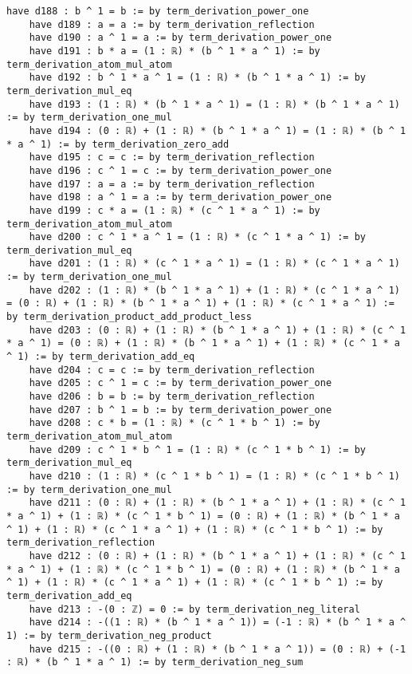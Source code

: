 \documentclass{article}
\begin{document}
\begin{tcolorbox}[colback=white!10, width=\linewidth]
\begin{lstlisting}[language=Lean4]
    have d188 : b ^ 1 = b := by term_derivation_power_one
    have d189 : a = a := by term_derivation_reflection
    have d190 : a ^ 1 = a := by term_derivation_power_one
    have d191 : b * a = (1 : ℝ) * (b ^ 1 * a ^ 1) := by term_derivation_atom_mul_atom
    have d192 : b ^ 1 * a ^ 1 = (1 : ℝ) * (b ^ 1 * a ^ 1) := by term_derivation_mul_eq
    have d193 : (1 : ℝ) * (b ^ 1 * a ^ 1) = (1 : ℝ) * (b ^ 1 * a ^ 1) := by term_derivation_one_mul
    have d194 : (0 : ℝ) + (1 : ℝ) * (b ^ 1 * a ^ 1) = (1 : ℝ) * (b ^ 1 * a ^ 1) := by term_derivation_zero_add
    have d195 : c = c := by term_derivation_reflection
    have d196 : c ^ 1 = c := by term_derivation_power_one
    have d197 : a = a := by term_derivation_reflection
    have d198 : a ^ 1 = a := by term_derivation_power_one
    have d199 : c * a = (1 : ℝ) * (c ^ 1 * a ^ 1) := by term_derivation_atom_mul_atom
    have d200 : c ^ 1 * a ^ 1 = (1 : ℝ) * (c ^ 1 * a ^ 1) := by term_derivation_mul_eq
    have d201 : (1 : ℝ) * (c ^ 1 * a ^ 1) = (1 : ℝ) * (c ^ 1 * a ^ 1) := by term_derivation_one_mul
    have d202 : (1 : ℝ) * (b ^ 1 * a ^ 1) + (1 : ℝ) * (c ^ 1 * a ^ 1) = (0 : ℝ) + (1 : ℝ) * (b ^ 1 * a ^ 1) + (1 : ℝ) * (c ^ 1 * a ^ 1) := by term_derivation_product_add_product_less
    have d203 : (0 : ℝ) + (1 : ℝ) * (b ^ 1 * a ^ 1) + (1 : ℝ) * (c ^ 1 * a ^ 1) = (0 : ℝ) + (1 : ℝ) * (b ^ 1 * a ^ 1) + (1 : ℝ) * (c ^ 1 * a ^ 1) := by term_derivation_add_eq
    have d204 : c = c := by term_derivation_reflection
    have d205 : c ^ 1 = c := by term_derivation_power_one
    have d206 : b = b := by term_derivation_reflection
    have d207 : b ^ 1 = b := by term_derivation_power_one
    have d208 : c * b = (1 : ℝ) * (c ^ 1 * b ^ 1) := by term_derivation_atom_mul_atom
    have d209 : c ^ 1 * b ^ 1 = (1 : ℝ) * (c ^ 1 * b ^ 1) := by term_derivation_mul_eq
    have d210 : (1 : ℝ) * (c ^ 1 * b ^ 1) = (1 : ℝ) * (c ^ 1 * b ^ 1) := by term_derivation_one_mul
    have d211 : (0 : ℝ) + (1 : ℝ) * (b ^ 1 * a ^ 1) + (1 : ℝ) * (c ^ 1 * a ^ 1) + (1 : ℝ) * (c ^ 1 * b ^ 1) = (0 : ℝ) + (1 : ℝ) * (b ^ 1 * a ^ 1) + (1 : ℝ) * (c ^ 1 * a ^ 1) + (1 : ℝ) * (c ^ 1 * b ^ 1) := by term_derivation_reflection
    have d212 : (0 : ℝ) + (1 : ℝ) * (b ^ 1 * a ^ 1) + (1 : ℝ) * (c ^ 1 * a ^ 1) + (1 : ℝ) * (c ^ 1 * b ^ 1) = (0 : ℝ) + (1 : ℝ) * (b ^ 1 * a ^ 1) + (1 : ℝ) * (c ^ 1 * a ^ 1) + (1 : ℝ) * (c ^ 1 * b ^ 1) := by term_derivation_add_eq
    have d213 : -(0 : ℤ) = 0 := by term_derivation_neg_literal
    have d214 : -((1 : ℝ) * (b ^ 1 * a ^ 1)) = (-1 : ℝ) * (b ^ 1 * a ^ 1) := by term_derivation_neg_product
    have d215 : -((0 : ℝ) + (1 : ℝ) * (b ^ 1 * a ^ 1)) = (0 : ℝ) + (-1 : ℝ) * (b ^ 1 * a ^ 1) := by term_derivation_neg_sum

\end{lstlisting}
\end{tcolorbox}
\end{document}
